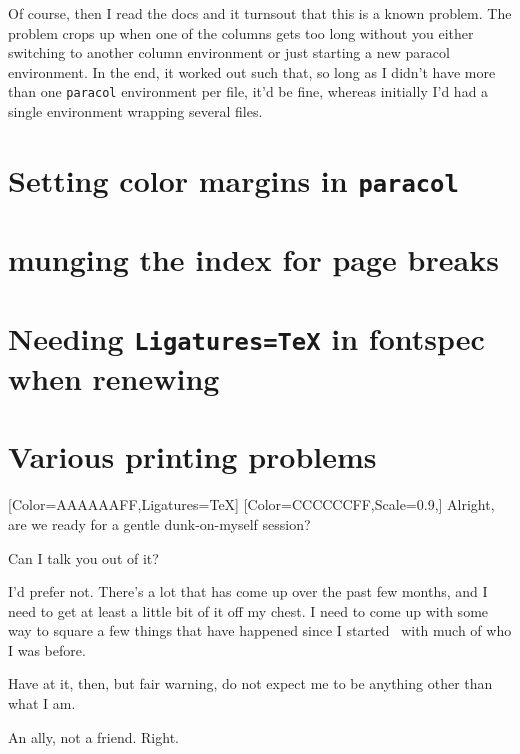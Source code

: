 \begin{paracol}{2}
\begin{leftcolumn}
Of course, then I read the docs and it turnsout that this is a known problem. The problem crops up when one of the columns gets too long without you either switching to another column environment or just starting a new paracol environment. In the end, it worked out such that, so long as I didn't have more than one \texttt{paracol} environment per file, it'd be fine, whereas initially I'd had a single environment wrapping several files.


\section*{Setting color margins in \texttt{paracol}}\label{color-margins}


\section*{munging the index for page breaks}\label{indexmunge}


\section*{Needing \texttt{Ligatures=TeX} in fontspec when renewing}\label{ligatures}


\section*{Various printing problems}\label{printing}


\end{leftcolumn}
\begin{rightcolumn}
  [Color=AAAAAAFF,Ligatures=TeX]
  \renewfontfamily{}[Color=CCCCCCFF,Scale=0.9,]
  \noindent Alright, are we ready for a gentle dunk-on-myself session?
  
  \begin{ally}
    Can I talk you out of it?
  \end{ally}
  I'd prefer not. There's a lot that has come up over the past few months, and I need to get at least a little bit of it off my chest. I need to come up with some way to square a few things that have happened since I started \allyWord\ with much of who I was before.

  \begin{ally}
    Have at it, then, but fair warning, do not expect me to be anything other than what I am.
  \end{ally}
  An ally, not a friend. Right.


\end{rightcolumn}
\end{paracol}
